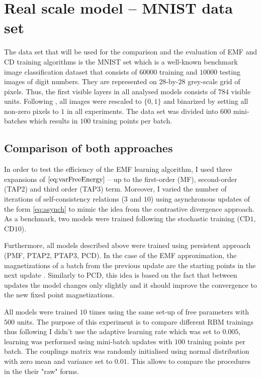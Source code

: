 \section{Real scale model -- MNIST data set}
The data set that will be used for the comparison and the evaluation of EMF and CD training algorithms is the MNIST set \cite{lecun1998} which is a well-known benchmark image classification dataset that consists of $60000$ training and $10000$ testing images of digit numbers. They are represented
on $28$-by-$28$ grey-scale grid of pixels. Thus, the first visible layers in all analysed models consists of $784$ visible units. Following \cite{gabrie2015training}, \cite{salakhutdinov2008learning} all images were rescaled to $ \lbrace 0, 1 \rbrace $ and binarized by setting all non-zero pixels to $1$ in all experiments.
The data set was divided into $600$ mini-batches which results in $100$ training points per batch.

\subsection{Comparison of both approaches}
In order to test the efficiency of the EMF learning algorithm, I used three expansions of $\ref{eq:varFreeEnergy}$ -- up to the first-order (MF), second-order (TAP2) and third order (TAP3) term. Moreover, I varied the number of iterations of self-consistency relations ($3$ and $10$) using asynchronous updates of the form \ref{eq:asynch} to mimic the idea from the contrastive divergence approach. As a benchmark, two models were trained following the stochastic training (CD$1$, CD$10$).

Furthermore, all models described above were trained using persistent approach (PMF, PTAP2, PTAP3, PCD). In the case of the EMF approximation, the magnetizations of a batch  from the previous update are the starting points in the next update \cite{gabrie2015training}. Similarly to PCD, this idea is based on the fact that between updates the model changes only slightly and it should improve the convergence to the new fixed point magnetizations.

All models were trained $10$ times using the same set-up of free parameters with $500$ units. The purpose of this experiment is to compare different RBM trainings thus following \cite{gabrie2015training} I didn't use the adaptive learning rate which was set to $0.005$, learning was performed using mini-batch updates with $100$ training points per batch. The couplings matrix was randomly initialised using normal distribution with zero mean and variance set to $0.01$. This allows to compare the procedures in the their "raw" forms. 

